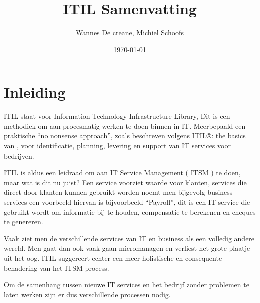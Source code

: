 \documentclass{article}
\date{\today}
\title{ITIL Samenvatting}
\author{Wannes De creane, Michiel Schoofs}
\begin{document}
	\maketitle
	\section{Inleiding}
	ITIL staat voor Information Technology Infrastructure Library, Dit is een methodiek om aan procesmatig werken te doen binnen in IT. Meerbepaald een praktische “no nonsense approach”, zoals beschreven volgens ITIL®: the basics van \cite{Cater-Steel2006}, voor identificatie, planning, levering en support van IT services voor bedrijven.\\
	
	\par
	\noindent
	ITIL is aldus een leidraad om aan IT Service Management ( ITSM ) te doen, maar wat is dit nu juist? Een service voorziet waarde voor klanten, services die direct door klanten kunnen gebruikt worden noemt men bijgevolg business services een voorbeeld hiervan is bijvoorbeeld “Payroll”, dit is een IT service die gebruikt wordt om informatie bij te houden, compensatie te berekenen en cheques te genereren.\\
	
	\par
	\noindent
	Vaak ziet men de verschillende services van IT en business als een volledig andere wereld. Men gaat dan ook vaak gaan micromanagen en verliest het grote plaatje uit het oog. ITIL suggereert echter een meer holistische en consequente benadering van het ITSM process.\\
	
	\par
	\noindent
	Om de samenhang tussen nieuwe IT services en het bedrijf zonder problemen te laten werken zijn er dus verschillende processen nodig.
	
	
	\printbibliography
\end{document}
